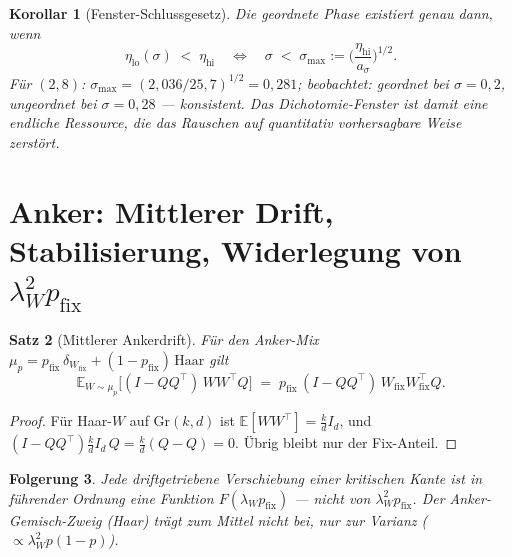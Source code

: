\documentclass[11pt,a4paper]{article}
\newtheorem{satz}{Satz}
\newtheorem{korollar}[satz]{Korollar}
\newtheorem{folgerung}[satz]{Folgerung}
\theoremstyle{remark}
\newcommand{\Gr}{\mathrm{Gr}}
\newcommand{\E}{\mathbb{E}}
\begin{document}
\begin{korollar}[Fenster-Schlussgesetz]\label{kor:schluss}
Die geordnete Phase existiert genau dann, wenn
\[
\eta_{\mathrm{lo}}(\sigma)\;<\;\eta_{\mathrm{hi}}
\quad\Longleftrightarrow\quad
\sigma\;<\;\sigma_{\max}:=\Big(\frac{\eta_{\mathrm{hi}}}{a_\sigma}\Big)^{1/2}.
\]
Für $(2,8)$: $\sigma_{\max}=(2{,}036/25{,}7)^{1/2}=0{,}281$;
beobachtet: geordnet bei $\sigma=0{,}2$, ungeordnet bei $\sigma=0{,}28$ --- konsistent.
Das Dichotomie-Fenster ist damit eine endliche Ressource, die das Rauschen
auf quantitativ vorhersagbare Weise zerstört.
\end{korollar}

\section{Anker: Mittlerer Drift, Stabilisierung, Widerlegung von $\lambda_W^2p_{\mathrm{fix}}$}

\begin{satz}[Mittlerer Ankerdrift]\label{thm:ankerdrift}
Für den Anker-Mix $\mu_p=p_{\mathrm{fix}}\,\delta_{W_{\mathrm{fix}}}+(1-p_{\mathrm{fix}})\,\mathrm{Haar}$ gilt
\[
\E_{W\sim\mu_p}\Big[(I-QQ^\top)\,W W^\top Q\Big]
\;=\;p_{\mathrm{fix}}\,(I-QQ^\top)\,W_{\mathrm{fix}}W_{\mathrm{fix}}^\top Q .
\]
\end{satz}
\begin{proof}
Für Haar-$W$ auf $\Gr(k,d)$ ist $\E[WW^\top]=\frac{k}{d}I_d$, und
$(I-QQ^\top)\frac{k}{d}I_d\,Q=\frac{k}{d}(Q-Q)=0$. Übrig bleibt nur der
Fix-Anteil.
\end{proof}

\begin{folgerung}
Jede driftgetriebene Verschiebung einer kritischen Kante ist in führender
Ordnung eine Funktion $F(\lambda_W p_{\mathrm{fix}})$ --- nicht von
$\lambda_W^2p_{\mathrm{fix}}$. Der Anker-Gemisch-Zweig (Haar) trägt zum
Mittel nicht bei, nur zur Varianz ($\propto\lambda_W^2p(1-p)$).
\end{folgerung}
\end{document}

